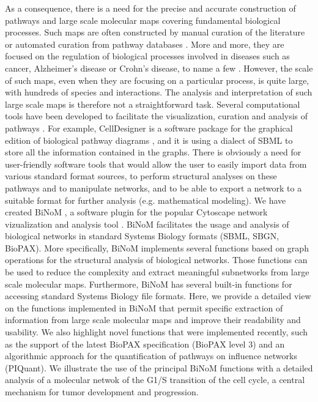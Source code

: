\documentclass[10pt]{bmc_article}
\newenvironment{bmcformat}{\baselineskip20pt\sloppy\setboolean{publ}{false}}{\baselineskip20pt\sloppy}
\begin{document}
\begin{bmcformat}
As a consequence, there is a need for the precise and accurate construction of
pathways and large scale molecular maps covering fundamental biological
processes. Such maps are often constructed by manual curation of the literature or
automated curation from pathway databases \cite{bauer2009pathway}. More and more, they
are focused on the regulation of biological processes involved in diseases such
as cancer, Alzheimer's disease or Crohn's disease, to name a few \cite{oda2005comprehensive, oda2006comprehensive,
calzone2008comprehensive, caron2010comprehensive}. However, the scale of such
maps, even when they are focusing on a particular process, is quite large, with
hundreds of species and interactions. The analysis and interpretation of such
large scale maps is therefore not a straightforward task. Several computational
tools have been developed to facilitate the visualization, curation and analysis
of pathways \cite{adriaens2008public}. For example, CellDesigner is a software package
for the graphical edition of biological pathway diagrams
\cite{funahashi2003celldesigner}, and it is using a dialect
of SBML to store all the information contained in the graphs. There is obviously
a need for user-friendly software tools that would allow the user to easily
import data from various standard format sources, to perform structural analyses on these pathways 
and to manipulate networks, and to be able to export a network to a suitable
format for further analysis (e.g. mathematical modeling). We have created
BiNoM \cite{zinovyev2008binom}, a software plugin for the popular Cytoscape
network vizualization and analysis tool \cite{cline2007integration}. BiNoM
facilitates the usage and analysis of biological networks in standard Systems
Biology formats (SBML, SBGN, BioPAX). More specifically, BiNoM implements
several functions based on graph operations for the structural analysis of
biological networks. Those functions can be used to reduce the complexity and
extract meaningful subnetworks from large scale molecular maps. Furthermore,
BiNoM has several built-in functions for accessing standard Systems Biology file
formats. Here, we provide a detailed view on the functions implemented in BiNoM
that permit specific extraction of information from large scale molecular maps
and improve their readability and usability. We also highlight novel functions
that were implemented recently, such as the support of the latest BioPAX
specification (BioPAX level 3) and an algorithmic approach for the
quantification of pathways on influence networks (PIQuant). We illustrate the
use of the principal BiNoM functions with a detailed analysis of a molecular
netwok of the G1/S transition of the cell cycle, a central mechanism
for tumor development and progression.


\end{bmcformat}
\end{document}
